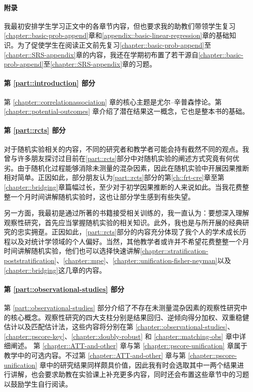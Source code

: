 \paragraph*{附录}
我最初安排学生学习正文中的各章节内容，但也要求我的助教们带领学生复习\ref{chapter::basic-prob-append}章和\ref{appendix::basic-linear-regression}章的基础知识。为了促使学生在阅读正文前先复习\ref{chapter::basic-prob-append}至\ref{chapter::SRS-appendix}章的内容，我还在学期初布置了若干源自\ref{chapter::basic-prob-append}至\ref{chapter::SRS-appendix}章的习题。



\paragraph*{第 \ref{part::introduction} 部分 }
第 \ref{chapter::correlationassociation} 章的核心主题是尤尔–辛普森悖论。第 \ref{chapter::potential-outcomes} 章介绍了潜在结果这一概念，它也是整本书的基础。 



\paragraph*{第 \ref{part::rcts} 部分}
对于随机实验相关的内容，不同的研究者和教学者可能会持有截然不同的观点。我曾与许多朋友探讨过目前在\ref{part::rcts}部分中对随机实验的阐述方式究竟有何优劣。由于随机化过程能够消除未测量的混杂因素，因此在随机实验中开展因果推断相对简单。正因如此，部分朋友认为\ref{part::rcts}部分的第\ref{ch::frt-cre}章至第\ref{chapter::bridging}章篇幅过长，至少对于初学因果推断的人来说如此。当我花费整整一个月时间讲解随机实验时，这也让部分学生感到有些失望。

另一方面，我最初是通过\citet{imbens2015causal}所著的书籍接受相关训练的，我一直认为：要想深入理解观察性研究，首先应当掌握随机实验的相关知识。此外，我也是\citet{Neyman:1923}与\citet{Fisher:1935}所开展的经典研究的忠实拥趸。正因如此，\ref{part::rcts}部分的内容充分体现了我个人的学术成长历程以及对统计学领域的个人偏好。当然，其他教学者或许并不希望花费整整一个月时间讲解随机实验，他们也可以选择快速讲解\ref{chapter::stratification-poststratification}、\ref{chapter::mpe}、\ref{chapter::unification-fisher-neyman}以及\ref{chapter::bridging}这几章的内容。


\paragraph*{第 \ref{part::observational-studies} 部分}
第 \ref{part::observational-studies} 部分介绍了不存在未测量混杂因素的观察性研究中的核心概念。观察性研究的四大支柱分别是结果回归、逆倾向得分加权、双重稳健估计以及匹配估计法，这些内容将分别在第 \ref{chapter::observational-studies}、\ref{chapter::pscore-key}、\ref{chapter::doubly-robust} 和 \ref{chapter::matching-obs} 章中详细阐述。
第 \ref{chapter::ATT-and-other} 章与第 \ref{chapter::pscore-unification} 章属于教学中的可选内容。不过第 \ref{chapter::ATT-and-other} 章与第 \ref{chapter::pscore-unification} 章中的研究结果同样颇具价值，因此我有时会选取其中一两个结果进行讲解，也会要求助教在实验课上补充更多内容，同时还会布置这些章节中的习题以鼓励学生自行阅读。 


